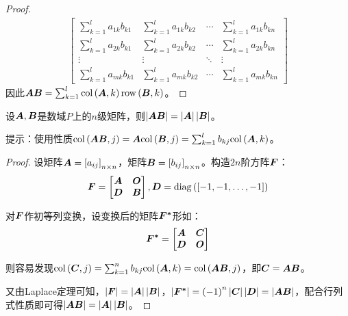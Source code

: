 \begin{proof}
\begin{align*}
\begin{bmatrix}
            \sum_{k=1}^la_{1k}b_{k1} & \sum_{k=1}^la_{1k}b_{k2} & \cdots & \sum_{k=1}^la_{1k}b_{kn} \\
            \sum_{k=1}^la_{2k}b_{k1} & \sum_{k=1}^la_{2k}b_{k2} & \cdots & \sum_{k=1}^la_{2k}b_{kn} \\
            \vdots                   & \vdots                   & \ddots & \vdots                   \\
            \sum_{k=1}^la_{mk}b_{k1} & \sum_{k=1}^la_{mk}b_{k2} & \cdots & \sum_{k=1}^la_{mk}b_{kn}
        \end{bmatrix}
    \end{align*}
    因此\(\boldsymbol{A}\boldsymbol{B}=\sum_{k=1}^l\mathrm{col}\left( \boldsymbol{A},k \right)\mathrm{row}\left( \boldsymbol{B},k \right)\)。
\end{proof}

\begin{extraprob}\label{extra-1.3}
    设\(\boldsymbol{A},\boldsymbol{B}\)是数域\(P\)上的\(n\)级矩阵，则\(\left|\boldsymbol{A}\boldsymbol{B} \right|=\left|\boldsymbol{A} \right|\left|\boldsymbol{B} \right|\)。

    提示：使用性质\(\mathrm{col}\left( \boldsymbol{A}\boldsymbol{B},j \right)=\boldsymbol{A}\mathrm{col}\left( \boldsymbol{B},j \right)=\sum_{k=1}^lb_{kj}\mathrm{col}\left( \boldsymbol{A},k \right)\)。
\end{extraprob}
\begin{proof}
    设矩阵\(\boldsymbol{A}=\left[ a_{ij} \right]_{n\times n}\)，矩阵\(\boldsymbol{B}=\left[ b_{ij} \right]_{n\times n}\)。构造\(2n\)阶方阵\(\boldsymbol{F}\)：
    \begin{equation*}
        \boldsymbol{F}=
        \begin{bmatrix}
            \boldsymbol{A} & \boldsymbol{O} \\\boldsymbol{D}&\boldsymbol{B}
        \end{bmatrix},\boldsymbol{D}=\mathrm{diag}\left( \left[ -1,-1,\dots,-1 \right] \right)
    \end{equation*}

    对\(\boldsymbol{F}\)作初等列变换，设变换后的矩阵\(\boldsymbol{F^*}\)形如：
    \begin{equation*}
        \boldsymbol{F^*}=\begin{bmatrix}\boldsymbol{A}&\boldsymbol{C}\\\boldsymbol{D}&\boldsymbol{O}\end{bmatrix}
    \end{equation*}

    则容易发现\(\mathrm{col}\left( \boldsymbol{C},j \right)=\sum_{k=1}^nb_{kj}\mathrm{col}\left( \boldsymbol{A},k \right)=\mathrm{col}\left( \boldsymbol{A}\boldsymbol{B},j \right)\)，即\(\boldsymbol{C}=\boldsymbol{A}\boldsymbol{B}\)。

    又由Laplace定理可知，\(\left|\boldsymbol{F} \right|=\left|\boldsymbol{A} \right|\left|\boldsymbol{B} \right|\)，\(\left|\boldsymbol{F^*} \right|=\left( -1 \right)^n\left|\boldsymbol{C} \right|\left|\boldsymbol{D} \right|=\left|\boldsymbol{A}\boldsymbol{B} \right|\)，配合行列式性质即可得\(\left|\boldsymbol{A}\boldsymbol{B} \right|=\left|\boldsymbol{A} \right|\left|\boldsymbol{B} \right|\)。

\end{proof}

